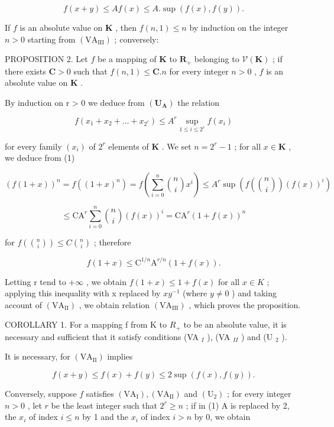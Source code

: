\[
f (x + y) \leqslant A f (x) \leqslant A. \sup (f (x), f (y)).
\]

If \(f\) is an absolute value on \(\mathbf{K}\) , then \(f(n,1) \leqslant n\) by induction on the integer \(n > 0\) starting from \((\mathrm{VA}_{\mathrm{III}})\) ; conversely:

PROPOSITION 2. Let \(f\) be a mapping of \(\mathbf{K}\) to \(\mathbf{R}_+\) belonging to \(\mathcal{V}(\mathbf{K})\) ; if there exists \(\mathbf{C} > 0\) such that \(f(n,1) \leqslant \mathbf{C}.n\) for every integer \(n > 0\) , \(f\) is an absolute value on \(\mathbf{K}\) .

By induction on r > 0 we deduce from \((\mathbf{U}_{\mathbf{A}})\) the relation

\[
f (x _ {1} + x _ {2} + \dots + x _ {2 ^ {r}}) \leqslant A ^ {r} \sup _ {1 \leqslant i \leqslant 2 ^ {r}} f (x _ {i})\tag{1}
\]

for every family \((x_{i})\) of \(2^{r}\) elements of \(\mathbf{K}\) . We set \(n = 2^{r} - 1\) ; for all \(x \in \mathbf{K}\) , we deduce from (1)

\[
(f (1 + x)) ^ {n} = f ((1 + x) ^ {n}) = f \left(\sum_ {i = 0} ^ {n} \binom {n} {i} x ^ {i}\right) \leqslant A ^ {r} \sup \left(f \left(\binom {n} {i}\right) (f (x)) ^ {i}\right)
\]

\[
\leqslant \mathrm{CA} ^ {r} \sum_ {i = 0} ^ {n} \binom {n} {i} (f (x)) ^ {i} = \mathrm{CA} ^ {r} (1 + f (x)) ^ {n}
\]

for \(f\left(\binom{n}{i}\right) \leqslant C\binom{n}{i}\) ; therefore

\[
f (1 + x) \leqslant \mathrm{C} ^ {1 / n} \mathrm{A} ^ {r / n} (1 + f (x)).
\]

Letting r tend to \(+\infty\) , we obtain \(f(1+x)\leqslant1+f(x)\) for all \(x\in K\) ; applying this inequality with x replaced by \(xy^{-1}\) (where \(y\neq0\) ) and taking account of \((\mathrm{VA}_{\mathrm{II}})\) , we obtain relation \((\mathrm{VA}_{\mathrm{III}})\) , which proves the proposition.

COROLLARY 1. For a mapping f from K to \(R_{+}\) to be an absolute value, it is necessary and sufficient that it satisfy conditions (VA \(_{I}\) ), (VA \(_{II}\) ) and (U \(_{2}\) ).

It is necessary, for \((\mathrm{VA}_{\mathrm{II}})\) implies

\[
f (x + y) \leqslant f (x) + f (y) \leqslant 2 \sup (f (x), f (y)).
\]

Conversely, suppose \(f\) satisfies \((\mathrm{VA}_{\mathrm{I}}), (\mathrm{VA}_{\mathrm{II}})\) and \((\mathrm{U}_2)\) ; for every integer \(n > 0\) , let \(r\) be the least integer such that \(2^r \geqslant n\) ; if in (1) A is replaced by 2, the \(x_i\) of index \(i \leqslant n\) by 1 and the \(x_i\) of index \(i > n\) by 0, we obtain

